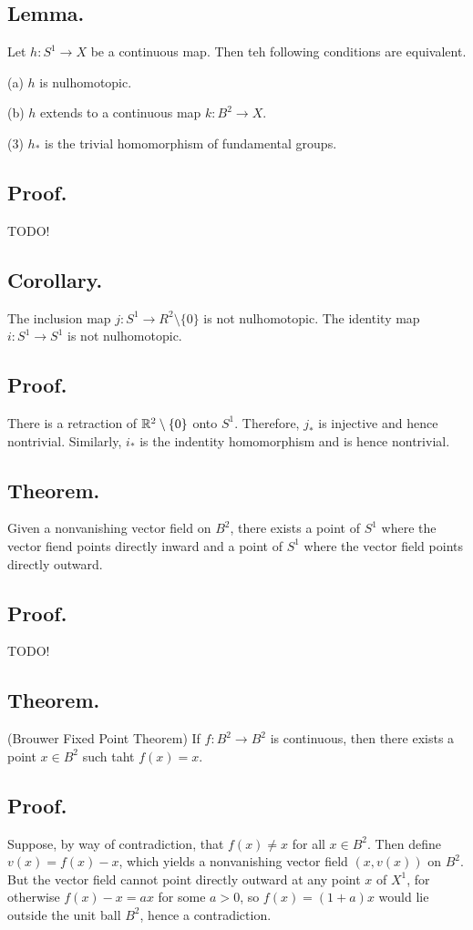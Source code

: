 \documentclass[titlepage]{article}
\begin{document}
\subsection{Lemma.} Let $h: S^{1} \to X$ be a continuous map. Then teh following conditions are equivalent.

(a) $h$ is nulhomotopic.

(b) $h$ extends to a continuous map $k: B^{2} \to X$.

(3) $h_{*}$ is the trivial homomorphism of fundamental groups.

\subsection{Proof.} TODO!

\subsection{Corollary.} The inclusion map $j: S^{1} \to R^{2} \setminus \{0\}$ is not nulhomotopic. The identity map $i: S^{1} \to S^{1}$ is not nulhomotopic.

\subsection{Proof.} There is a retraction of $\mathbb{R}^{2} \setminus \{0\}$ onto $S^{1}$. Therefore, $j_{*}$ is injective and hence nontrivial. Similarly, $i_{*}$ is the indentity homomorphism and is hence nontrivial.

\subsection{Theorem.} Given a nonvanishing vector field on $B^{2}$, there exists a point of $S^{1}$ where the vector fiend points directly inward and a point of $S^{1}$ where the vector field points directly outward.

\subsection{Proof.} TODO!

\subsection{Theorem.} (Brouwer Fixed Point Theorem) If $f: B^{2} \to B^{2}$ is continuous, then there exists a point $x \in B^{2}$ such taht $f(x) = x$.

\subsection{Proof.} Suppose, by way of contradiction, that $f(x) \neq x$ for all $x \in B^{2}$. Then define $v(x) = f(x) - x$, which yields a nonvanishing vector field $(x, v(x))$ on $B^{2}$. But the vector field cannot point directly outward at any point $x$ of $X^{1}$, for otherwise $f(x) - x = ax$ for some $a > 0$, so $f(x) = (1 + a)x$ would lie outside the unit ball $B^{2}$, hence a contradiction.
\end{document}
